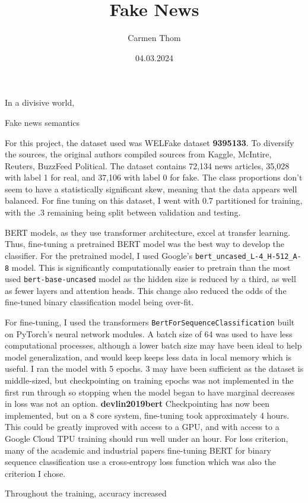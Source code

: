 \documentclass[12pt]{article}
\title{Fake News}
\author{Carmen Thom}
\date{04.03.2024}
\begin{document}
\maketitle


In a divisive world, 

Fake news semantics

For this project, the dataset used was WELFake dataset \textbf{9395133}. To diversify the sources, the original authors compiled sources from Kaggle, McIntire, Reuters, BuzzFeed Political. The dataset contains 72,134 news articles, 35,028 with label 1 for real, and 37,106 with label 0 for fake. The class proportions don't seem to have a statistically significant skew, meaning that the data appears well balanced. For fine tuning on this dataset, I went with 0.7 partitioned for training, with the .3 remaining being split between validation and testing. 

BERT models, as they use transformer architecture, excel at transfer learning. Thus, fine-tuning a pretrained BERT model was the best way to develop the classifier. For the pretrained model, I used Google's \verb|bert_uncased_L-4_H-512_A-8| model. This is significantly computationally easier to pretrain than the most used \verb|bert-base-uncased| model as the hidden size is reduced by a third, as well as fewer layers and attention heads. This change also reduced the odds of the fine-tuned binary classification model being over-fit. 

For fine-tuning, I used the transformers \verb|BertForSequenceClassification| built on PyTorch's neural network modules. A batch size of 64 was used to have less computational processes, although a lower batch size may have been ideal to help model generalization, and would keep keeps less data in local memory which is useful. I ran the model with 5 epochs. 3 may have been sufficient as the dataset is middle-sized, but checkpointing on training epochs was not implemented in the first run through so stopping when the model began to have marginal decreases in loss was not an option. \textbf{devlin2019bert} Checkpointing has now been implemented, but on a 8 core system, fine-tuning took approximately 4 hours. This could be greatly improved with access to a GPU, and with access to a Google Cloud TPU training should run well under an hour. For loss criterion, many of the academic and industrial papers fine-tuning BERT for binary sequence classification use a cross-entropy loss function which was also the criterion I chose. 

Throughout the training, accuracy increased 
\end{document}
